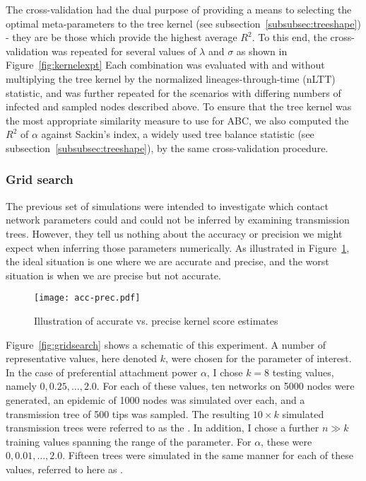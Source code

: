 The cross-validation had the dual purpose of providing a means to selecting the
optimal meta-parameters to the tree kernel (see
subsection~\ref{subsubsec:treeshape}) - they are be those which provide the
highest average $R^2$. To this end, the cross-validation was repeated for
several values of $\lambda$ and $\sigma$ as shown in Figure~\ref{fig:kernelexpt}
Each combination was evaluated with and without multiplying the tree kernel by
the normalized lineages-through-time (nLTT) statistic, and was further repeated
for the scenarios with differing numbers of infected and sampled nodes
described above. To ensure that the tree kernel was the most appropriate
similarity measure to use for ABC, we also computed the $R^2$ of $\alpha$
against Sackin's index, a widely used tree balance statistic (see
subsection~\ref{subsubsec:treeshape}), by the same cross-validation procedure.

\subsubsection{Grid search}

The previous set of simulations were intended to investigate which contact
network parameters could and could not be inferred by examining transmission
trees. However, they tell us nothing about the accuracy or precision we might
expect when inferring those parameters numerically. As illustrated in
Figure~\ref{fig:accprec}, the ideal situation is one where we are accurate and
precise, and the worst situation is when we are precise but not accurate.

\begin{figure}[ht]
  \centering
  \texttt{[image: acc-prec.pdf]}
  \caption{Illustration of accurate vs. precise kernel score estimates}
  \label{fig:accprec}
\end{figure}

Figure~\ref{fig:gridsearch} shows a schematic of this experiment. A number of
representative values, here denoted $k$, were chosen for the parameter of
interest. In the case of preferential attachment power $\alpha$, I chose $k =
8$ testing values, namely $0, 0.25, \ldots, 2.0$. For each of these values, ten
networks on 5000 nodes were generated, an epidemic of 1000 nodes was simulated
over each, and a transmission tree of 500 tips was sampled. The resulting $10
\times k$ simulated transmission trees were referred to as the . In addition, I chose a further $n \gg k$ training values spanning the
range of the parameter. For $\alpha$, these were $0, 0.01, \ldots, 2.0$.
Fifteen trees were simulated in the same manner for each of these values,
referred to here as .

